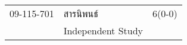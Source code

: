 \begin{longtable}{p{}p{}r{}}
09-115-701 & สารนิพนธ์ & 6(0-0)\\
& Independent Study & \\[3mm]
\end{longtable}
